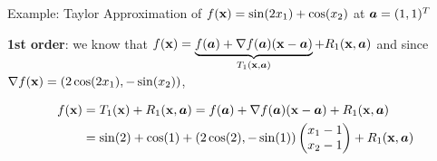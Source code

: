 \documentclass[11pt,compress,t,notes=noshow, xcolor=table]{beamer}
\begin{document}
\begin{frame2}{Example: Taylor Approximation of $\fx = \sin(2\MakeLowercase{x}_1) + \cos(\MakeLowercase{x}_2)$ at $\bm{\MakeLowercase{a}} = (1, 1)^T$}
\,\\
\begin{footnotesize}
\textbf{1st order}: we know that
    $
    f(\mathbf{x}) = \underbrace{f(\bm{a}) + \nabla f(\bm{a}) (\mathbf{x} - \bm{a})}_{T_1(\mathbf{x}, \bm{a})} + R_1(\mathbf{x},\bm{a})
    $
and since  $\nabla f(\mathbf{x}) = \left(2\cos(2x_1), -\sin(x_2)\right)$,

    \begin{align*}
        f(\mathbf{x}) &= T_1(\mathbf{x}) + R_1(\mathbf{x}, \bm{a}) = f(\bm{a}) + \nabla f(\bm{a}) (\mathbf{x} - \bm{a}) + R_1(\mathbf{x}, \bm{a})\\
        &= \sin(2) + \cos(1) + (2 \cos(2), - \sin(1))\begin{pmatrix} x_1 - 1 \\ x_2 - 1\end{pmatrix} + R_1(\mathbf{x}, \bm{a})
    \end{align*}
\end{footnotesize}

\vspace*{-0.5\baselineskip}

{}


\end{frame2}
\end{document}
